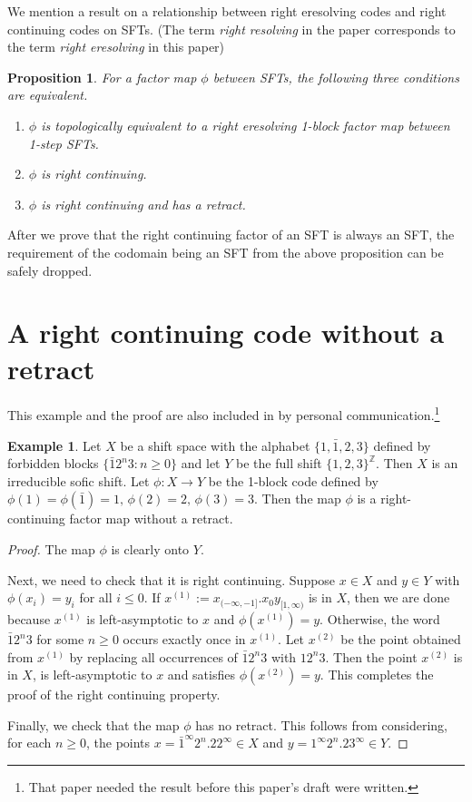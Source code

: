 \documentclass[a4paper]{amsart}
\newtheorem{proposition}[thm]{Proposition}
\theoremstyle{definition}
\newtheorem{example}{Example}[section]
\numberwithin{equation}{section}
\numberwithin{figure}{section}
\theoremstyle{definition}
\theoremstyle{remark}
\begin{document}
We mention a result \cite{BT-ITO} on a relationship between right eresolving codes and right continuing codes on SFTs. (The term \emph{right resolving} in the paper \cite{BT-ITO} corresponds to the term \emph{right eresolving} in this paper)

\begin{proposition}\label{prop:right-continuing}
  For a factor map $\phi$ between SFTs, the following three conditions are equivalent. 
  \begin{enumerate}
  \item $\phi$ is topologically equivalent to a right eresolving 1-block factor map between 1-step SFTs.
  \item $\phi$ is right continuing.
  \item $\phi$ is right continuing and has a retract.
  \end{enumerate}
\end{proposition}

After we prove that the right continuing factor of an SFT is always an SFT, the requirement of the codomain being an SFT from the above proposition can be safely dropped.

\section{A right continuing code without a retract}

This example and the proof are also included in \cite{J-ExistenceBiContinuing} by personal communication.\footnote{That paper needed the result before this paper's draft were written.}

\begin{example}
  Let $X$ be a shift space with the alphabet $\{1,\bar{1},2,3\}$
  defined by forbidden blocks $\{\bar{1}2^n 3 : n \ge 0 \}$ and let
  $Y$ be the full shift $\{1,2,3\}^\mathbb{Z}$. Then $X$ is an irreducible sofic shift. Let $\phi : X \to Y$
  be the 1-block code defined by $\phi(1) = \phi(\bar{1}) = 1,\,
  \phi(2)=2, \, \phi(3)=3$. Then the map $\phi$ is a right-continuing factor map without a retract.
\end{example}
  \begin{proof}
    The map $\phi$ is clearly onto $Y$.

    Next, we need to check that it is right continuing. Suppose $x\in X$ and $y\in Y$ with
    $\phi(x_i)=y_i$ for all $i\le 0$.  If $x^{(1)} :=
    x_{(-\infty,-1]}.x_0y_{[1,\infty)}$ is in $X$, then we are done
    because $x^{(1)}$ is left-asymptotic to $x$ and $\phi(x^{(1)}) =
    y$.  Otherwise, the word $\bar{1}2^n 3$ for some $n \ge 0$ occurs
    exactly once in $x^{(1)}$.  Let $x^{(2)}$ be the point obtained
    from $x^{(1)}$ by replacing all occurrences of $\bar{1}2^n 3$ with $12^n 3$.  Then the
    point $x^{(2)}$ is in $X$, is left-asymptotic to $x$ and satisfies
    $\phi(x^{(2)}) = y$. This completes the proof of the right continuing property.

    Finally, we check that the map $\phi$ has no retract. This follows from considering, for each $n\ge0$, the points $x =
    \bar{1}^\infty 2^n . 2 2^\infty \in X$ and $y = 1^\infty 2^n . 2
    3^\infty \in Y$.
  \end{proof}
\end{document}
